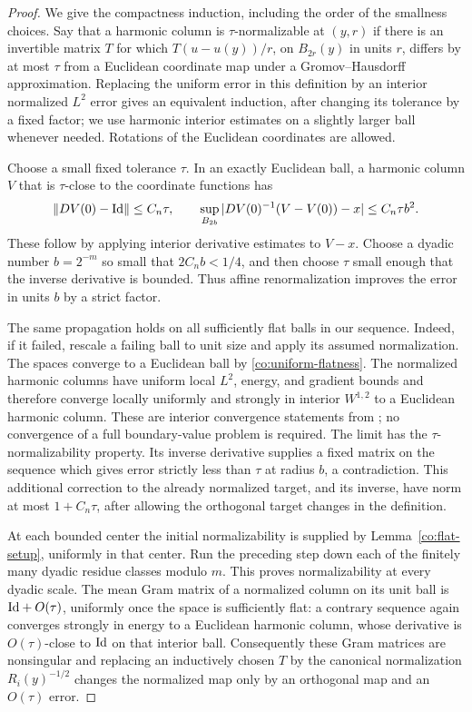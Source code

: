 \begin{proof}
We give the compactness induction, including the order of the
smallness choices.  Say that a harmonic column is
\(\tau\)-normalizable at \((y,r)\) if there is an invertible
matrix \(T\) for which
\(T(u-u(y))/r\), on \(B_{2r}(y)\) in units \(r\), differs by at
most \(\tau\) from a Euclidean coordinate map under a
Gromov--Hausdorff approximation.  Replacing the uniform error in
this definition by an interior normalized \(L^2\) error gives an
equivalent induction, after changing its tolerance by a fixed
factor; we use harmonic interior estimates on a slightly larger
ball whenever needed.  Rotations of the Euclidean coordinates
are allowed.

Choose a small fixed tolerance \(\tau\).  In an exactly Euclidean
ball, a harmonic column \(V\) that is \(\tau\)-close to the
coordinate functions has
\[
 \|DV(0)-\mathrm{Id}\|\le C_n\tau,
 \qquad
 \sup_{B_{2b}}|DV(0)^{-1}(V-V(0))-x|
 \le C_n\tau b^2.
\]
These follow by applying interior derivative estimates to \(V-x\).
Choose a dyadic number \(b=2^{-m}\) so small that
\(2C_n b<1/4\), and then choose \(\tau\) small enough that the
inverse derivative is bounded.  Thus affine renormalization
improves the error in units \(b\) by a strict factor.

The same propagation holds on all sufficiently flat balls in our
sequence.  Indeed, if it failed, rescale a failing ball to unit
size and apply its assumed normalization.  The spaces converge to
a Euclidean ball by \eqref{co:uniform-flatness}.  The normalized
harmonic columns have uniform local \(L^2\), energy, and gradient
bounds and therefore converge locally uniformly and strongly in
interior \(W^{1,2}\) to a Euclidean harmonic column.  These are
interior convergence statements from \cite[Section~4]{AH18}; no
convergence of a full boundary-value problem is required.  The
limit has the \(\tau\)-normalizability property.  Its inverse
derivative supplies a fixed matrix on the sequence which gives
error strictly less than \(\tau\) at radius \(b\), a
contradiction.  This additional correction to the already normalized
target, and its inverse, have norm at most \(1+C_n\tau\), after
allowing the orthogonal target changes in the definition.

At each bounded center the initial normalizability is supplied by
Lemma~\ref{co:flat-setup}, uniformly in that center.  Run the
preceding step down each of the finitely many dyadic residue
classes modulo \(m\).  This proves normalizability at every
dyadic scale.  The mean Gram matrix of a normalized column on its
unit ball is \(\mathrm{Id}+O(\tau)\), uniformly once the space is
sufficiently flat: a contrary sequence again converges strongly
in energy to a Euclidean harmonic column, whose derivative is
\(O(\tau)\)-close to \(\mathrm{Id}\) on that interior ball.  Consequently
these Gram matrices are nonsingular and replacing an inductively
chosen \(T\) by the canonical normalization \(R_i(y)^{-1/2}\)
changes the normalized map only by an orthogonal map and an
\(O(\tau)\) error.


\end{proof}

